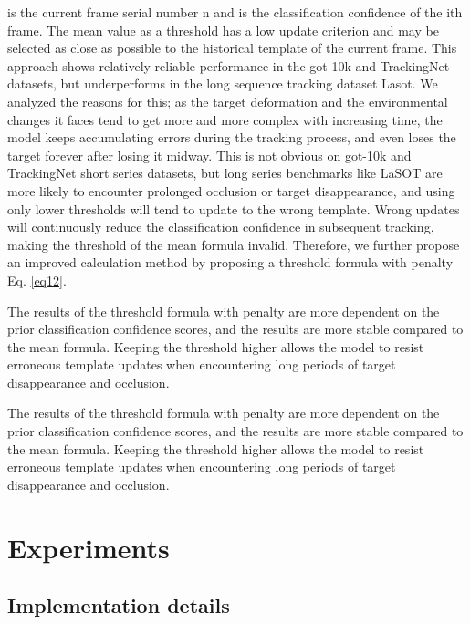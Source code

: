 \documentclass[letterpaper]{article} \usepackage{aaai23}  \usepackage{times}  \usepackage{helvet}  \usepackage{courier}  \usepackage[hyphens]{url}  \usepackage{graphicx} \urlstyle{rm} \def\UrlFont{\rm}  \usepackage{natbib}  \usepackage{caption} \frenchspacing  \setlength{\pdfpagewidth}{8.5in}  \setlength{\pdfpageheight}{11in}  \usepackage{algorithm}
\begin{document}
 is the current frame serial number n and  is the classification confidence of the ith frame. The mean value as a threshold has a low update criterion and may be selected as close as possible to the historical template of the current frame. This approach shows relatively reliable performance in the got-10k and TrackingNet datasets, but underperforms in the long sequence tracking dataset Lasot. We analyzed the reasons for this; as the target deformation and the environmental changes it faces tend to get more and more complex with increasing time, the model keeps accumulating errors during the tracking process, and even loses the target forever after losing it midway. This is not obvious on got-10k and TrackingNet short series datasets, but long series benchmarks like LaSOT are more likely to encounter prolonged occlusion or target disappearance, and using only lower thresholds will tend to update to the wrong template. Wrong updates will continuously reduce the classification confidence in subsequent tracking, making the threshold of the mean formula invalid. Therefore, we further propose an improved calculation method by proposing a threshold formula with penalty Eq. \ref{eq12}.

The results of the threshold formula with penalty are more dependent on the prior classification confidence scores, and the results are more stable compared to the mean formula. Keeping the threshold higher allows the model to resist erroneous template updates when encountering long periods of target disappearance and occlusion.

The results of the threshold formula with penalty are more dependent on the prior classification confidence scores, and the results are more stable compared to the mean formula. Keeping the threshold higher allows the model to resist erroneous template updates when encountering long periods of target disappearance and occlusion.

\section{Experiments}

\subsection{Implementation details}
\end{document}
